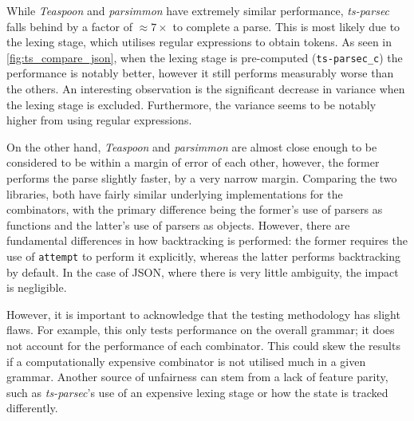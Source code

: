 While \textit{Teaspoon} and \textit{parsimmon} have extremely similar performance, \textit{ts-parsec} falls behind by a factor of $\approx 7 \times$ to complete a parse.
This is most likely due to the lexing stage, which utilises regular expressions to obtain tokens.
As seen in \autoref{fig:ts_compare_json}, when the lexing stage is pre-computed (\texttt{ts-parsec\_c}) the performance is notably better, however it still performs measurably worse than the others.
An interesting observation is the significant decrease in variance when the lexing stage is excluded.
Furthermore, the variance seems to be notably higher from using regular expressions.

On the other hand, \textit{Teaspoon} and \textit{parsimmon} are almost close enough to be considered to be within a margin of error of each other, however, the former performs the parse slightly faster, by a very narrow margin.
Comparing the two libraries, both have fairly similar underlying implementations for the combinators, with the primary difference being the former's use of parsers as functions and the latter's use of parsers as objects.
However, there are fundamental differences in how backtracking is performed: the former requires the use of \texttt{attempt} to perform it explicitly, whereas the latter performs backtracking by default.
In the case of JSON, where there is very little ambiguity, the impact is negligible.

However, it is important to acknowledge that the testing methodology has slight flaws.
For example, this only tests performance on the overall grammar; it does not account for the performance of each combinator.
This could skew the results if a computationally expensive combinator is not utilised much in a given grammar.
Another source of unfairness can stem from a lack of feature parity, such as \textit{ts-parsec}'s use of an expensive lexing stage or how the state is tracked differently.
